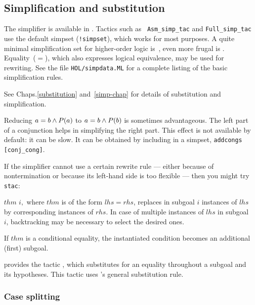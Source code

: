 \subsection{Simplification and substitution}

The simplifier is available in \HOL.  Tactics such as {\tt
  Asm_simp_tac} and \texttt{Full_simp_tac} use the default simpset
({\tt!simpset}), which works for most purposes.  A quite minimal
simplification set for higher-order logic is~,
even more frugal is .  Equality~($=$), which
also expresses logical equivalence, may be used for rewriting.  See
the file \texttt{HOL/simpdata.ML} for a complete listing of the basic
simplification rules.

See %
{Chaps.\ts\ref{substitution} and~\ref{simp-chap}} for details of substitution
and simplification.

\begin{warn}%
  Reducing $a=b\wedge P(a)$ to $a=b\wedge P(b)$ is sometimes advantageous.  The
  left part of a conjunction helps in simplifying the right part.  This effect
  is not available by default: it can be slow.  It can be obtained by
  including  in a simpset, \verb$addcongs [conj_cong]$.
\end{warn}

If the simplifier cannot use a certain rewrite rule --- either because
of nontermination or because its left-hand side is too flexible ---
then you might try \texttt{stac}:
\begin{ttdescription}
\item[\ttindexbold{stac} $thm$ $i,$] where $thm$ is of the form $lhs = rhs$,
  replaces in subgoal $i$ instances of $lhs$ by corresponding instances of
  $rhs$.  In case of multiple instances of $lhs$ in subgoal $i$, backtracking
  may be necessary to select the desired ones.

If $thm$ is a conditional equality, the instantiated condition becomes an
additional (first) subgoal.
\end{ttdescription}

 \HOL{} provides the tactic , which substitutes
  for an equality throughout a subgoal and its hypotheses.  This tactic uses
  \HOL's general substitution rule.

\subsubsection{Case splitting}
\label{subsec:HOL:case:splitting}

